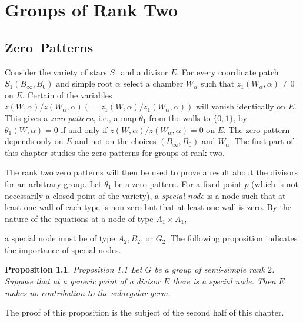 \documentclass{memo-l}
\newtheorem{proposition}[theorem]{Proposition}
\theoremstyle{definition}
\theoremstyle{remark}
\numberwithin{section}{chapter}
\numberwithin{equation}{chapter}
\begin{document}


%
\chapter{Groups of Rank Two} 
%


\section{Zero\ Patterns}



  Consider the variety of stars $S_{1}$ and a divisor $E$. 
 For every coordinate patch $S_{1}(B_{{\infty}},B_{0})$ and simple root 
${\alpha}$ select a chamber $W_{\alpha}$ such that 
$z_{1}(W_{\alpha},{\alpha})\ne 0$ on $E$. 
 Certain of the variables $z(W,{\alpha})/z(W_{\alpha},{\alpha}) 
(= z_{1}(W,{\alpha})/z_{1}(W_{\alpha},{\alpha}))$ will vanish identically 
on $E$. 
  This gives a {\it zero pattern}, i.e., 
a map ${\theta}_{1}$ from the walls to $\{0,1\}$, by 
${\theta}_{1}(W,{\alpha}) = 0$ if and only if $z(W,{\alpha})/z(W_{\alpha},
{\alpha}) = 0$ on $E$. 
 The zero pattern depends only on $E$ and not on the choices 
$(B_{{\infty}},B_{0})$ and $W_{\alpha}$. 
 The first part of this chapter studies the zero patterns for groups of 
rank two. 

   The rank two zero patterns will then be used to prove a result about 
the divisors for an arbitrary group. 
 Let ${\theta}_{1}$ be a zero pattern. 
 For a fixed point $p$ (which is not necessarily a closed point of the 
variety), a {\it special node}  is a node such that at least one wall of 
each type is non-zero but that at least one wall is zero. 
 By the nature of the equations at a node of type $A_{1} \times A_{1}$,

\medskip

\medskip
\noindent
a special node must be of type $A_{2}, B_{2}$, or $G_{2}$. 
  The following proposition indicates the importance of special nodes.

\begin{proposition}{Proposition 1.1}   Let $G$ be a group of semi-simple rank $2$. 
 Suppose that at a generic point of a divisor $E$ there is a special node. 
 Then $E$ makes no contribution to the subregular germ. 
 \end{proposition}

   The proof of this proposition is the subject of the second half of 
this chapter.
\end{document}
